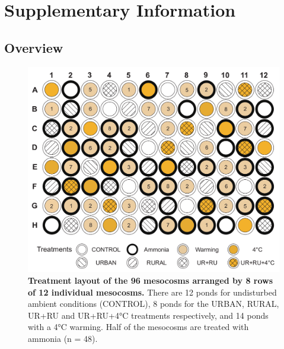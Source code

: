 
\renewcommand{\thefigure}{SI.\arabic{figure}}
\setcounter{figure}{0}

\renewcommand{\thetable}{SI.\arabic{table}}
\setcounter{table}{0}

\section*{Supplementary Information}\label{sec:SI}

\renewcommand{\thesubsection}{SI.\arabic{subsection}}
\setcounter{subsection}{0}


\subsection{Overview}

\begin{figure}[H]
    \centering
    \includegraphics[scale=0.35]{./Figures/Mesocosm}
    \caption{\textbf{Treatment layout of the 96 mesocosms arranged by 8 rows of 12 individual mesocosms.} There are 12 ponds for undisturbed ambient conditions (CONTROL), 8 ponds for the URBAN, RURAL, UR+RU and UR+RU+4°C treatments respectively, and 14 ponds with a 4°C warming. Half of the mesocosms are treated with ammonia (n = 48).}
    \label{fig:Mesocosm}
\end{figure}

